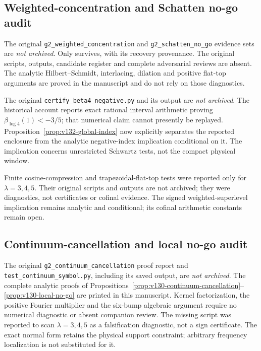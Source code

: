 \documentclass[11pt]{article}
\theoremstyle{remark}
\begin{document}
\subsection*{Weighted-concentration and Schatten no-go audit}
The original \texttt{g2\_weighted\_concentration} and
\texttt{g2\_schatten\_no\_go} evidence sets are \emph{not archived}.
Only  survives,
with its recovery provenance. The original scripts, outputs, candidate
register and complete adversarial reviews are absent. The analytic
Hilbert--Schmidt, interlacing, dilation and positive flat-top arguments
are proved in the manuscript and do not rely on those diagnostics.

The original \texttt{certify\_beta4\_negative.py} and its output are
\emph{not archived}. The historical account reports exact rational
interval arithmetic proving $\beta_{\log4}(1)<-3/5$; that numerical
claim cannot presently be replayed. Proposition~\ref{prop:v132-global-index}
now explicitly separates the reported enclosure from the analytic
negative-index implication conditional on it. The implication concerns
unrestricted Schwartz tests, not the compact physical window.

Finite cosine-compression and trapezoidal-flat-top tests were reported
only for $\lambda=3,4,5$. Their original scripts and outputs are not
archived; they were diagnostics, not certificates or cofinal evidence.
The signed weighted-superlevel implication remains analytic and
conditional; its cofinal arithmetic constants remain open.

\subsection*{Continuum-cancellation and local no-go audit}
The original \texttt{g2\_continuum\_cancellation} proof report and
\texttt{test\_continuum\_symbol.py}, including its saved output, are
\emph{not archived}. The complete analytic proofs of
Propositions~\ref{prop:v130-continuum-cancellation}--\ref{prop:v130-local-no-go}
are printed in this manuscript. Kernel factorization, the positive
Fourier multiplier and the six-bump algebraic argument require no
numerical diagnostic or absent companion review.
The missing script was reported to scan $\lambda=3,4,5$ as a
falsification diagnostic, not a sign certificate. The exact normal
form retains the physical support constraint; arbitrary frequency
localization is not substituted for it.
\end{document}
